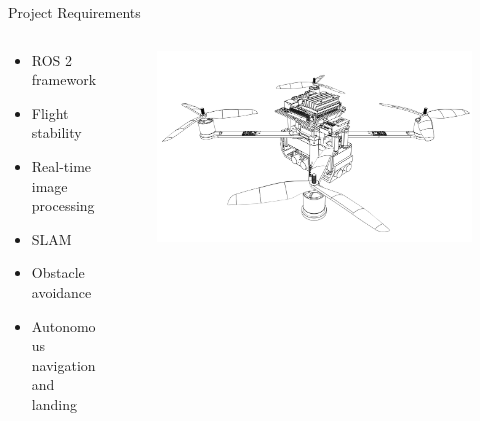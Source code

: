 \begin{frame}{Project Requirements}


    \begin{columns}
        \begin{column}{0.4\textwidth}
        \begin{itemize}
            \item ROS 2 framework
            \item Flight stability
            \item Real-time image processing
            \item SLAM
            \item Obstacle avoidance
            \item Autonomous navigation and landing
        \end{itemize}
        \end{column}
        \begin{column}{0.6\textwidth}  %
            \begin{figure}
                \centering
                \includegraphics[width=1\textwidth]{img/carcara2.png}
                \label{fig:carcara2}
            \end{figure}
        \end{column}
    \end{columns}
\end{frame}

